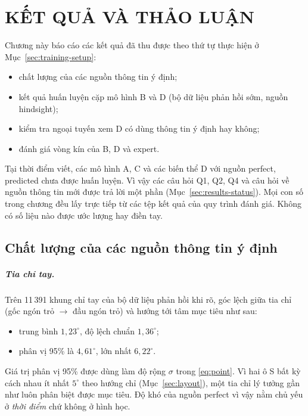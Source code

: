 \chapter{KẾT QUẢ VÀ THẢO LUẬN}
\label{chap:results}

Chương này báo cáo các kết quả đã thu được theo thứ tự thực hiện ở Mục~\ref{sec:training-setup}:
\begin{itemize}
  \item chất lượng của các nguồn thông tin ý định;
  \item kết quả huấn luyện cặp mô hình B và D (bộ dữ liệu phản hồi sớm, nguồn hindsight);
  \item kiểm tra ngoại tuyến xem D có dùng thông tin ý định hay không;
  \item đánh giá vòng kín của B, D và expert.
\end{itemize}

Tại thời điểm viết, các mô hình A, C và các biến thể D với nguồn perfect, predicted chưa được huấn luyện. Vì vậy các câu hỏi Q1, Q2, Q4 và câu hỏi về nguồn thông tin mới được trả lời một phần (Mục~\ref{sec:results-status}). Mọi con số trong chương đều lấy trực tiếp từ các tệp kết quả của quy trình đánh giá. Không có số liệu nào được ước lượng hay điền tay.

\section{Chất lượng của các nguồn thông tin ý định}
\label{sec:source-quality}

\paragraph{Tia chỉ tay.} Trên 11\,391 khung chỉ tay của bộ dữ liệu phản hồi khi rõ, góc lệch giữa tia chỉ (gốc ngón trỏ $\to$ đầu ngón trỏ) và hướng tới tâm mục tiêu như sau:
\begin{itemize}
  \item trung bình $1{,}23^\circ$, độ lệch chuẩn $1{,}36^\circ$;
  \item phân vị 95\% là $4{,}61^\circ$, lớn nhất $6{,}22^\circ$.
\end{itemize}
Giá trị phân vị 95\% được dùng làm độ rộng $\sigma$ trong \eqref{eq:point}. Vì hai ô S bất kỳ cách nhau ít nhất $5^\circ$ theo hướng chỉ (Mục~\ref{sec:layout}), một tia chỉ lý tưởng gần như luôn phân biệt được mục tiêu. Độ khó của nguồn perfect vì vậy nằm chủ yếu ở \emph{thời điểm} chứ không ở hình học.


